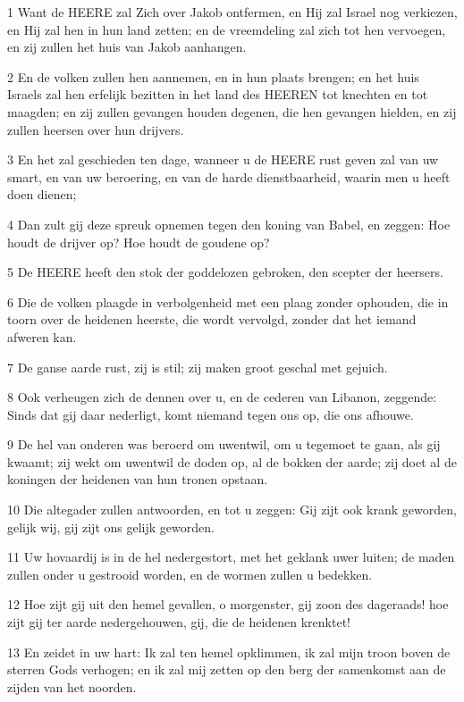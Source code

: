 \par 1 Want de HEERE zal Zich over Jakob ontfermen, en Hij zal Israel nog verkiezen, en Hij zal hen in hun land zetten; en de vreemdeling zal zich tot hen vervoegen, en zij zullen het huis van Jakob aanhangen.
\par 2 En de volken zullen hen aannemen, en in hun plaats brengen; en het huis Israels zal hen erfelijk bezitten in het land des HEEREN tot knechten en tot maagden; en zij zullen gevangen houden degenen, die hen gevangen hielden, en zij zullen heersen over hun drijvers.
\par 3 En het zal geschieden ten dage, wanneer u de HEERE rust geven zal van uw smart, en van uw beroering, en van de harde dienstbaarheid, waarin men u heeft doen dienen;
\par 4 Dan zult gij deze spreuk opnemen tegen den koning van Babel, en zeggen: Hoe houdt de drijver op? Hoe houdt de goudene op?
\par 5 De HEERE heeft den stok der goddelozen gebroken, den scepter der heersers.
\par 6 Die de volken plaagde in verbolgenheid met een plaag zonder ophouden, die in toorn over de heidenen heerste, die wordt vervolgd, zonder dat het iemand afweren kan.
\par 7 De ganse aarde rust, zij is stil; zij maken groot geschal met gejuich.
\par 8 Ook verheugen zich de dennen over u, en de cederen van Libanon, zeggende: Sinds dat gij daar nederligt, komt niemand tegen ons op, die ons afhouwe.
\par 9 De hel van onderen was beroerd om uwentwil, om u tegemoet te gaan, als gij kwaamt; zij wekt om uwentwil de doden op, al de bokken der aarde; zij doet al de koningen der heidenen van hun tronen opstaan.
\par 10 Die altegader zullen antwoorden, en tot u zeggen: Gij zijt ook krank geworden, gelijk wij, gij zijt ons gelijk geworden.
\par 11 Uw hovaardij is in de hel nedergestort, met het geklank uwer luiten; de maden zullen onder u gestrooid worden, en de wormen zullen u bedekken.
\par 12 Hoe zijt gij uit den hemel gevallen, o morgenster, gij zoon des dageraads! hoe zijt gij ter aarde nedergehouwen, gij, die de heidenen krenktet!
\par 13 En zeidet in uw hart: Ik zal ten hemel opklimmen, ik zal mijn troon boven de sterren Gods verhogen; en ik zal mij zetten op den berg der samenkomst aan de zijden van het noorden.
